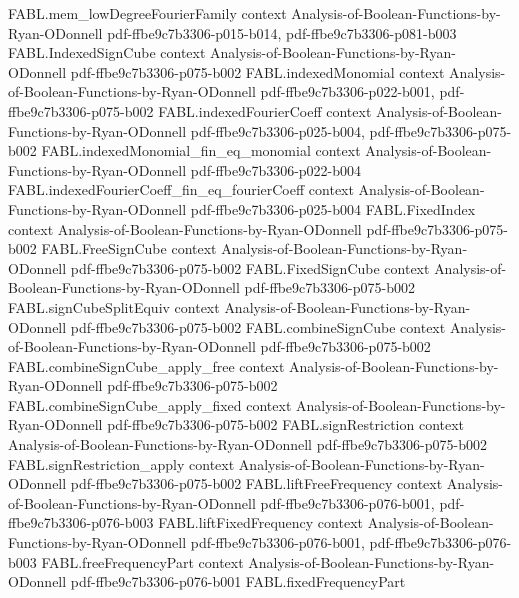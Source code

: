 \begin{theorem}
\proofstep
  {FABL.mem_lowDegreeFourierFamily}
  {context}
  {Analysis-of-Boolean-Functions-by-Ryan-ODonnell}
  {pdf-ffbe9c7b3306-p015-b014,
    pdf-ffbe9c7b3306-p081-b003}
\proofstep
  {FABL.IndexedSignCube}
  {context}
  {Analysis-of-Boolean-Functions-by-Ryan-ODonnell}
  {pdf-ffbe9c7b3306-p075-b002}
\proofstep
  {FABL.indexedMonomial}
  {context}
  {Analysis-of-Boolean-Functions-by-Ryan-ODonnell}
  {pdf-ffbe9c7b3306-p022-b001,
    pdf-ffbe9c7b3306-p075-b002}
\proofstep
  {FABL.indexedFourierCoeff}
  {context}
  {Analysis-of-Boolean-Functions-by-Ryan-ODonnell}
  {pdf-ffbe9c7b3306-p025-b004,
    pdf-ffbe9c7b3306-p075-b002}
\proofstep
  {FABL.indexedMonomial_fin_eq_monomial}
  {context}
  {Analysis-of-Boolean-Functions-by-Ryan-ODonnell}
  {pdf-ffbe9c7b3306-p022-b004}
\proofstep
  {FABL.indexedFourierCoeff_fin_eq_fourierCoeff}
  {context}
  {Analysis-of-Boolean-Functions-by-Ryan-ODonnell}
  {pdf-ffbe9c7b3306-p025-b004}
\proofstep
  {FABL.FixedIndex}
  {context}
  {Analysis-of-Boolean-Functions-by-Ryan-ODonnell}
  {pdf-ffbe9c7b3306-p075-b002}
\proofstep
  {FABL.FreeSignCube}
  {context}
  {Analysis-of-Boolean-Functions-by-Ryan-ODonnell}
  {pdf-ffbe9c7b3306-p075-b002}
\proofstep
  {FABL.FixedSignCube}
  {context}
  {Analysis-of-Boolean-Functions-by-Ryan-ODonnell}
  {pdf-ffbe9c7b3306-p075-b002}
\proofstep
  {FABL.signCubeSplitEquiv}
  {context}
  {Analysis-of-Boolean-Functions-by-Ryan-ODonnell}
  {pdf-ffbe9c7b3306-p075-b002}
\proofstep
  {FABL.combineSignCube}
  {context}
  {Analysis-of-Boolean-Functions-by-Ryan-ODonnell}
  {pdf-ffbe9c7b3306-p075-b002}
\proofstep
  {FABL.combineSignCube_apply_free}
  {context}
  {Analysis-of-Boolean-Functions-by-Ryan-ODonnell}
  {pdf-ffbe9c7b3306-p075-b002}
\proofstep
  {FABL.combineSignCube_apply_fixed}
  {context}
  {Analysis-of-Boolean-Functions-by-Ryan-ODonnell}
  {pdf-ffbe9c7b3306-p075-b002}
\proofstep
  {FABL.signRestriction}
  {context}
  {Analysis-of-Boolean-Functions-by-Ryan-ODonnell}
  {pdf-ffbe9c7b3306-p075-b002}
\proofstep
  {FABL.signRestriction_apply}
  {context}
  {Analysis-of-Boolean-Functions-by-Ryan-ODonnell}
  {pdf-ffbe9c7b3306-p075-b002}
\proofstep
  {FABL.liftFreeFrequency}
  {context}
  {Analysis-of-Boolean-Functions-by-Ryan-ODonnell}
  {pdf-ffbe9c7b3306-p076-b001,
    pdf-ffbe9c7b3306-p076-b003}
\proofstep
  {FABL.liftFixedFrequency}
  {context}
  {Analysis-of-Boolean-Functions-by-Ryan-ODonnell}
  {pdf-ffbe9c7b3306-p076-b001,
    pdf-ffbe9c7b3306-p076-b003}
\proofstep
  {FABL.freeFrequencyPart}
  {context}
  {Analysis-of-Boolean-Functions-by-Ryan-ODonnell}
  {pdf-ffbe9c7b3306-p076-b001}
\proofstep
  {FABL.fixedFrequencyPart}

\end{theorem}
